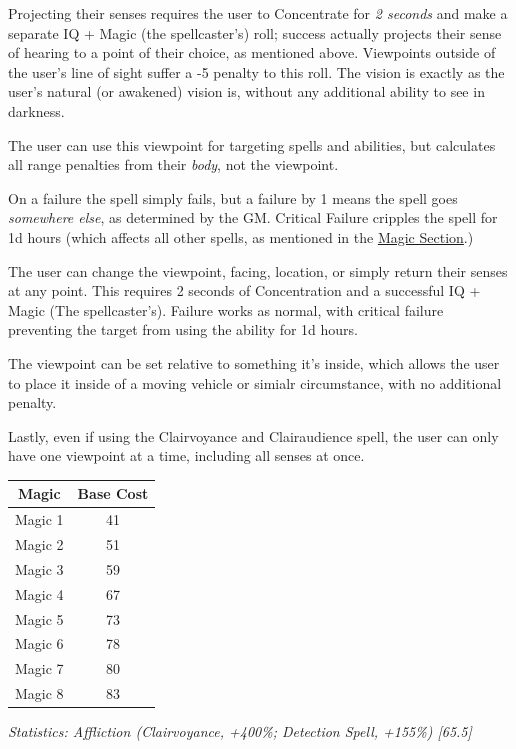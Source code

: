 \begin{multicols*}{3}
	Projecting their senses requires the user to Concentrate for \textit{2 seconds} and make a separate IQ + Magic (the spellcaster's) roll; success actually projects their sense of hearing to a point of their choice, as mentioned above. Viewpoints outside of the user's line of sight suffer a -5 penalty to this roll. The vision is exactly as the user's natural (or awakened) vision is, without any additional ability to see in darkness.
	
	The user can use this viewpoint for targeting spells and abilities, but calculates all range penalties from their \textit{body}, not the viewpoint.
	
	On a failure the spell simply fails, but a failure by 1 means the spell goes \textit{somewhere else}, as determined by the GM. Critical Failure cripples the spell for 1d hours (which affects all other spells, as mentioned in the \hyperref[magic]{Magic Section}.)
	
	The user can change the viewpoint, facing, location, or simply return their senses at any point. This requires 2 seconds of Concentration and a successful IQ + Magic (The spellcaster's). Failure works as normal, with critical failure preventing the target from using the ability for 1d hours.
	
	The viewpoint can be set relative to something it's inside, which allows the user to place it inside of a moving vehicle or simialr circumstance, with no additional penalty.
	
	Lastly, even if using the Clairvoyance and Clairaudience spell, the user can only have one viewpoint at a time, including all senses at once.
	
	\begin{center}
		\begin{tabular}{|c|c|}
			\hline
			Magic & Base Cost \\
			\hline
			\hline
			Magic 1 & 41 \\
			Magic 2 & 51 \\
			Magic 3 & 59 \\
			Magic 4 & 67 \\
			Magic 5 & 73 \\
			Magic 6 & 78 \\
			Magic 7 & 80 \\
			Magic 8 & 83 \\
			\hline
		\end{tabular}
	\end{center}
	
	\textcolor{OliveGreen}{\textit{ Statistics: Affliction (Clairvoyance, +400\%; Detection Spell, +155\%) [65.5]}}
	

\end{multicols*}
